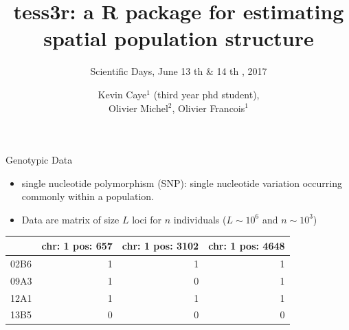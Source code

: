 \documentclass{beamer}\usepackage[]{graphicx}\usepackage[]{color}
\title{tess3r: a R package for estimating spatial population structure}
\subtitle[\ldots]{Scientific Days, June 13 th \& 14 th , 2017}
\author{Kevin Caye$^{1}$ (third year phd student), \\
  Olivier Michel$^{2}$, Olivier Francois$^{1}$}
\institute{$^{1}$ TIMC-IMAG, $^{2}$ GIPSA-lab}
\date{}
\newenvironment{knitrout}{}{} %
\begin{document}
\frame{\titlepage} 





\begin{frame}{Genotypic Data}
\begin{itemize}
  \item single nucleotide polymorphism (SNP): single nucleotide variation
    occurring commonly within a population.
  \item Data are matrix of size $L$ loci for $n$ individuals ($L \sim 10^6$ and
    $n \sim 10^3$)
\end{itemize}

\begin{center}
\begin{knitrout}
\color{fgcolor}
\begin{tabular}{l|r|r|r}
\hline
  & chr: 1 pos: 657 & chr: 1 pos: 3102 & chr: 1 pos: 4648\\
\hline
02B6 & 1 & 1 & 1\\
\hline
09A3 & 1 & 0 & 1\\
\hline
12A1 & 1 & 1 & 1\\
\hline
13B5 & 0 & 0 & 0\\
\hline
\end{tabular}


\end{knitrout}
\end{center}

\end{frame}
\end{document}
